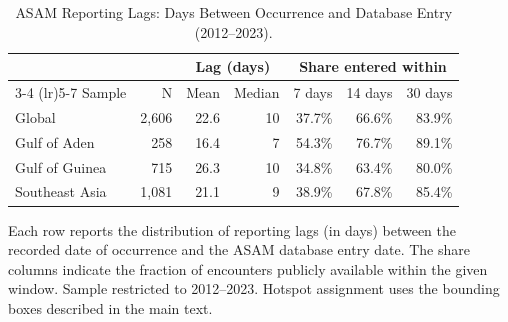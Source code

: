 \begin{table}[htbp]
\centering
\begin{threeparttable}
\caption{ASAM Reporting Lags: Days Between Occurrence and Database Entry (2012--2023).}
\label{tab:asam-reporting-lags}
\begin{tabular}{lrrrrrr}
\toprule
 & & \multicolumn{2}{c}{Lag (days)} & \multicolumn{3}{c}{Share entered within} \\
\cmidrule(lr){3-4} \cmidrule(lr){5-7}
Sample & N & Mean & Median & 7 days & 14 days & 30 days \\
\midrule
Global & 2,606 & 22.6 & 10 & 37.7\% & 66.6\% & 83.9\% \\
Gulf of Aden & 258 & 16.4 & 7 & 54.3\% & 76.7\% & 89.1\% \\
Gulf of Guinea & 715 & 26.3 & 10 & 34.8\% & 63.4\% & 80.0\% \\
Southeast Asia & 1,081 & 21.1 & 9 & 38.9\% & 67.8\% & 85.4\% \\
\bottomrule
\end{tabular}
\begin{tablenotes}
\item \scriptsize Each row reports the distribution of reporting lags (in days) between the recorded date of occurrence and the ASAM database entry date. The share columns indicate the fraction of encounters publicly available within the given window. Sample restricted to 2012--2023. Hotspot assignment uses the bounding boxes described in the main text.
\end{tablenotes}
\end{threeparttable}
\end{table}
